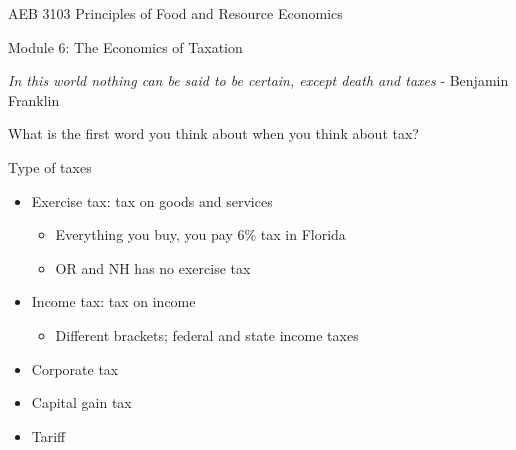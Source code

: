 \documentclass[
  ignorenonframetext,
]{beamer}
\author{}
\date{\vspace{-2.5em}}
\providecommand{\tightlist}{%
  \setlength{\itemsep}{0pt}\setlength{\parskip}{0pt}}
\begin{document}
\begin{frame}{AEB 3103 Principles of Food and Resource Economics}
\protect\hypertarget{aeb-3103-principles-of-food-and-resource-economics}{}
\begin{block}{Module 6: The Economics of Taxation}
\protect\hypertarget{module-6-the-economics-of-taxation}{}
\end{block}
\end{frame}

\begin{frame}{}
\protect\hypertarget{section}{}
\emph{In this world nothing can be said to be certain, except death and
taxes} - Benjamin Franklin
\end{frame}

\begin{frame}{}
\protect\hypertarget{section-1}{}
What is the first word you think about when you think about tax?
\end{frame}

\begin{frame}{Type of taxes}
\protect\hypertarget{type-of-taxes}{}
\begin{itemize}
\tightlist
\item
  Exercise tax: tax on goods and services

  \begin{itemize}
  \tightlist
  \item
    Everything you buy, you pay 6\% tax in Florida
  \item
    OR and NH has no exercise tax
  \end{itemize}
\item
  Income tax: tax on income

  \begin{itemize}
  \tightlist
  \item
    Different brackets; federal and state income taxes
  \end{itemize}
\item
  Corporate tax
\item
  Capital gain tax
\item
  Tariff
\end{itemize}
\end{frame}
\end{document}
